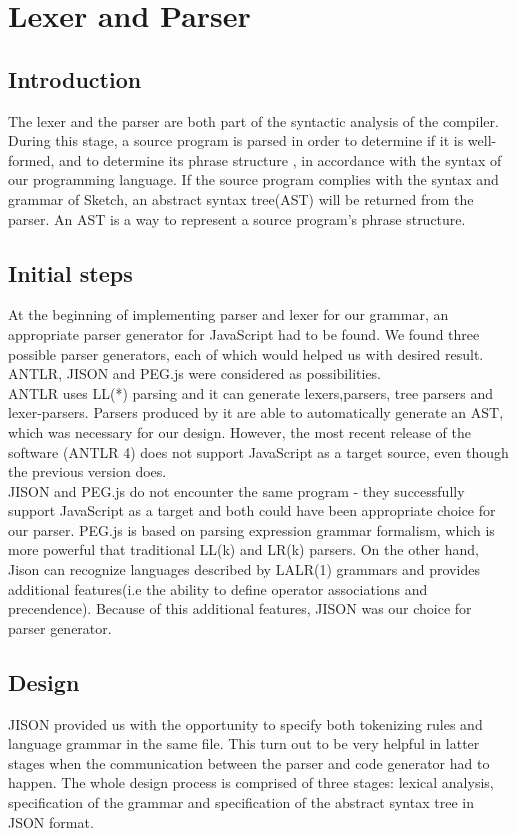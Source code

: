 \documentclass{l3proj}
\begin{document}
\section{Lexer and Parser}
\label{arch-lex}
\subsection{Introduction}
The lexer and the parser are both part of the syntactic analysis of the compiler. During this stage, a source program is parsed in order to determine if it is well-formed, and to determine its phrase structure , in accordance with the syntax of our programming language. If the source program complies with the syntax and grammar of Sketch, an abstract syntax tree(AST) will be returned from the parser. An AST is a way to represent a source program’s phrase structure. 

\subsection{Initial steps}
At the beginning of implementing parser and lexer for our grammar, an appropriate parser generator for JavaScript had to be found. We found three possible parser generators, each of which would helped us with desired result. ANTLR, JISON and PEG.js were considered as possibilities.
\\[12pt]
ANTLR uses LL(*) parsing and it can generate lexers,parsers, tree parsers and lexer-parsers. Parsers produced by it are able to automatically generate an AST, which was necessary for our design. However, the most recent release of the software (ANTLR 4) does not support JavaScript as a target source, even though the previous version does. 
\\[12pt]
JISON and PEG.js do not encounter the same program - they successfully support JavaScript as a target and both could have been appropriate choice for our parser. PEG.js is based on parsing expression grammar formalism, which is more powerful that traditional LL(k) and LR(k) parsers. On the other hand, Jison can recognize languages described by LALR(1) grammars and provides additional features(i.e the ability to define operator associations and precendence). Because of this additional features, JISON was our choice for parser generator. 


\setcounter{secnumdepth}{3}
\subsection{Design}
JISON provided us with the opportunity to specify both tokenizing rules and language grammar in the same file. This turn out to be very helpful in latter stages when the communication between the parser and code generator had to happen. The whole design process is comprised of three stages: lexical analysis, specification of the grammar and specification of the abstract syntax tree in JSON format. 
\end{document}
